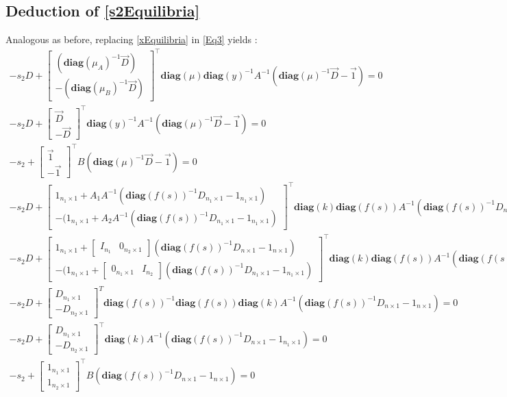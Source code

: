 \documentclass[3p,times]{elsarticle}
\newcommand{\diag}{\textbf{diag}}
\begin{document}
\subsection{Deduction of \eqref{s2Equilibria}}
Analogous as before, replacing \eqref{xEquilibria} in \eqref{Eq3} yields :
\begin{align}
-s_2D+
\begin{bmatrix}
(\diag(\mu_A)^{-1} \vec{D}) \\ -(\diag(\mu_B)^{-1} \vec{D})
\end{bmatrix}^\top \diag(\mu)\diag(y)^{-1} A^{-1}(\diag(\mu)^{-1}\vec{D}-\vec{1}) = 0 \\
-s_2D+
\begin{bmatrix}
\vec{D} \\ - \vec{D}
\end{bmatrix}^\top \diag(y)^{-1} A^{-1}(\diag(\mu)^{-1}\vec{D}-\vec{1}) = 0\\
-s_2+
\begin{bmatrix}
\vec{1} \\ - \vec{1}
\end{bmatrix}^\top B(\diag(\mu)^{-1}\vec{D}-\vec{1}) = 0
\end{align}
\begin{align} 
-s_2D+ \begin{bmatrix}
1_{n_1 \times 1}+A_1A^{-1}(\diag(f(s))^{-1}D_{n_1 \times 1}-1_{n_1 \times 1}) \\-(1_{n_1 \times 1}+A_2A^{-1}(\diag(f(s))^{-1}D_{n_1 \times 1}-1_{n_1 \times 1})
\end{bmatrix}^\top \diag(k)\diag(f(s))A^{-1}(\diag(f(s))^{-1}D_{n \times 1}-1_{n \times 1}) = 0 \\
-s_2D+	\begin{bmatrix}
1_{n_1 \times 1}+\begin{bmatrix}
I_{n_1} & 0_{n_2 \times 1} 
\end{bmatrix}(\diag(f(s))^{-1}D_{n \times 1}-1_{n \times 1}) \\-(1_{n_1 \times 1}+\begin{bmatrix}
0_{n_1 \times 1} & I_{n_2} 
\end{bmatrix}(\diag(f(s))^{-1}D_{n_1 \times 1}-1_{n_1 \times 1})
\end{bmatrix}^\top \diag(k)\diag(f(s))A^{-1}(\diag(f(s))^{-1}D_{n \times 1}-1_{n \times 1}) = 0 \\
-s_2D +	\begin{bmatrix}
D_{n_1 \times 1}\\-D_{n_2 \times 1}
\end{bmatrix}^T\diag(f(s))^{-1}\diag(f(s)) \diag(k) A^{-1}(\diag(f(s))^{-1}D_{n \times 1}-1_{n \times 1}) = 0  \\
-s_2D+\begin{bmatrix}
D_{n_1 \times 1} \\-D_{n_2\times 1}
\end{bmatrix}^\top \diag(k)A^{-1}(\diag(f(s))^{-1}D_{n \times 1}-1_{n_1 \times 1}) = 0 \\
-s_2 + \begin{bmatrix}
1_{n_1 \times 1}\\1_{n_2 \times 1}
\end{bmatrix}^\top B (\diag(f(s))^{-1}D_{n \times 1} - 1_{n \times 1}) = 0 
\end{align}
\end{document}
